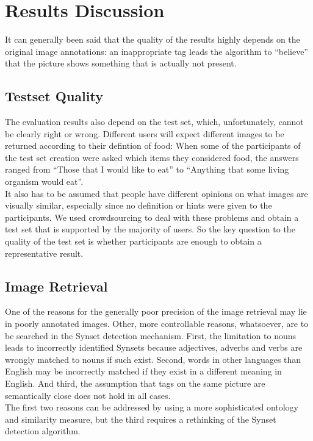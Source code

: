%
\section{Results Discussion}
\label{sec_discussion}

It can generally been said that the quality of the results highly depends on the original image annotations: an inappropriate tag leads the algorithm to ``believe'' that the picture shows something that is actually not present.

\subsection{Testset Quality}
The evaluation results also depend on the test set, which, unfortunately, cannot be clearly right or wrong. Different users will expect different images to be returned according to their defintion of food: When some of the participants of the test set creation were asked which items they considered food, the answers ranged from ``Those that I would like to eat'' to ``Anything that some living organism would eat''. \\
It also has to be assumed that people have different opinions on what images are visually similar, especially since no definition or hints were given to the participants. We used crowdsourcing to deal with these problems and obtain a test set that is supported by the majority of users. So the key question to the quality of the test set is whether  participants are enough to obtain a representative result.

\subsection{Image Retrieval}
One of the reasons for the generally poor precision of the image retrieval may lie in poorly annotated images.
Other, more controllable reasons, whatsoever, are to be searched in the Synset detection mechanism. First, the limitation to nouns leads to incorrectly identified Synsets because adjectives, adverbs and verbs are wrongly matched to nouns if such exist. 
Second, words in other languages than English may be incorrectly matched if they exist in a different meaning in English.
And third, the assumption that tags on the same picture are semantically close does not hold in all cases. \\
The first two reasons can be addressed by using a more sophisticated ontology and similarity measure, but the third requires a rethinking of the Synset detection algorithm.


